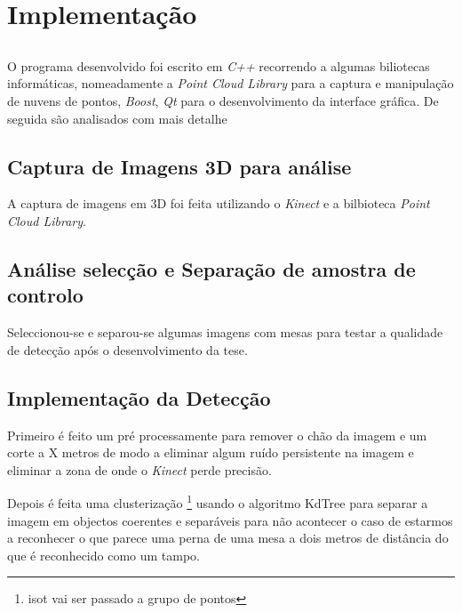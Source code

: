 \chapter{Implementação}\label{chap:chap4}

\section*{}



O programa desenvolvido foi escrito em \emph{C++} recorrendo a algumas biliotecas 
informáticas, nomeadamente a \emph{Point Cloud Library} para a captura e manipulação
de nuvens de pontos, \emph{Boost}, \emph{Qt} para o desenvolvimento da interface
gráfica. De seguida são analisados com mais detalhe 

\section{Captura de Imagens 3D para análise }

A captura de imagens em 3D foi feita utilizando o \emph{Kinect} e a bilbioteca
\emph{Point Cloud Library}.

\section{ Análise selecção e Separação de amostra de controlo}

Seleccionou-se e separou-se algumas imagens com mesas para testar a qualidade
de detecção após o desenvolvimento da tese.

\section {Implementação da Detecção}

Primeiro é feito um pré processamente para remover o chão da imagem e um corte a X
metros de modo a eliminar algum ruído persistente na imagem e eliminar a zona de
onde o \emph{Kinect} perde precisão.

Depois é feita uma clusterização \footnote{isot vai ser passado a grupo de pontos}
usando o algoritmo KdTree para separar a imagem em
objectos coerentes e separáveis para não acontecer o caso de estarmos a reconhecer
o que parece uma perna de uma mesa a dois metros de distância do que é reconhecido
como um tampo.

